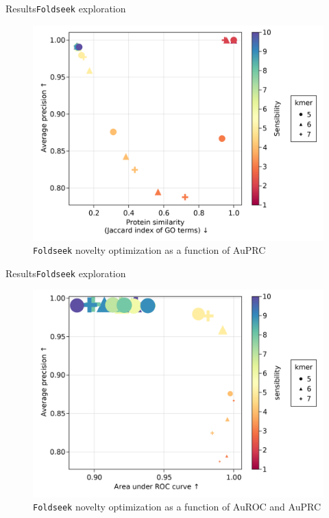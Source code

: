 \documentclass{beamer}
\begin{document}
\begin{frame}{Results}{\texttt{Foldseek} exploration}
	\begin{figure}
	\includegraphics[width=0.8\linewidth]{figures/JaccardvsAuPRC_optimization.png}
	\caption{\texttt{Foldseek} novelty optimization as a function of AuPRC}
	\end{figure}
\end{frame}

\begin{frame}{Results}{\texttt{Foldseek} exploration}
	\begin{figure}
	\includegraphics[width=0.8\linewidth]{figures/PerformaceNovelty_optimization.png}
	\caption{\texttt{Foldseek} novelty optimization as a function of AuROC and AuPRC}
	\end{figure}
\end{frame}
\end{document}
